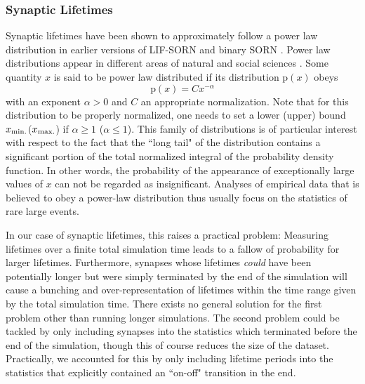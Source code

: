 \documentclass[10pt,a4paper]{article}
\begin{document}
\subsubsection{Synaptic Lifetimes}\label{Section_Syn_Lifetimes}
Synaptic lifetimes have been shown to approximately follow a power law distribution in earlier versions of LIF-SORN and binary SORN \cite{SORN_Paper,Pengsheng_2013}. Power law distributions appear in different areas of natural and social sciences \cite{Gabaix_1999,Pascual_2002,Kagan_2010}. Some quantity $x$ is said to be power law distributed if its distribution $\mathrm{p}(x)$ obeys
\begin{equation}
\mathrm{p}(x) = C x^{-\alpha}
\label{Pow_Law}
\end{equation}
with an exponent $\alpha>0$ and $C$ an appropriate normalization. Note that for this distribution to be properly normalized, one needs to set a lower (upper) bound $x_{\rm min.}$($x_{\rm max.}$) if $\alpha \geq 1$ ($\alpha \leq 1$). This family of distributions is of particular interest with respect to the fact that the ``long tail" of the distribution contains a significant portion of the total normalized integral of the probability density function. In other words, the probability of the appearance of exceptionally large values of $x$ can not be regarded as insignificant. Analyses of empirical data that is believed to obey a power-law distribution thus usually focus on the statistics of rare large events.

In our case of synaptic lifetimes, this raises a practical problem: Measuring lifetimes over a finite total simulation time leads to a fallow of probability for larger lifetimes. Furthermore, synapses whose lifetimes \emph{could} have been potentially longer but were simply terminated by the end of the simulation will cause a bunching and over-representation of lifetimes within the time range given by the total simulation time. There exists no general solution for the first problem other than running longer simulations. The second problem could be tackled by only including synapses into the statistics which terminated before the end of the simulation, though this of course reduces the size of the dataset. Practically, we accounted for this by only including lifetime periods into the statistics that explicitly contained an ``on-off" transition in the end.
\end{document}
